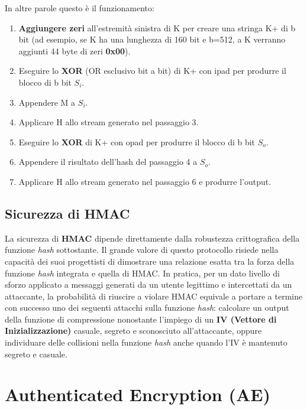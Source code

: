 \documentclass{article}
\begin{document}
\noindent In altre parole questo è il funzionamento:

\begin{enumerate}
    \item \textbf{Aggiungere zeri} all'estremità sinistra di K per creare una stringa K+ di b bit (ad esempio, se K ha una lunghezza di 160 bit e b=512, a K verranno aggiunti 44 byte di zeri \textbf{0x00}).
    \item Eseguire lo \textbf{XOR} (OR esclusivo bit a bit) di K+ con ipad per produrre il blocco di b bit $S_i$.
    \item Appendere M a $S_i$.
    \item Applicare H allo stream generato nel passaggio 3.
    \item Eseguire lo \textbf{XOR} di K+ con opad per produrre il blocco di b bit $S_o$.
    \item Appendere il risultato dell'hash del passaggio 4 a $S_o$.
    \item Applicare H allo stream generato nel passaggio 6 e produrre l'output.
\end{enumerate}

\vspace{0.5cm}

\subsection*{Sicurezza di HMAC}

La sicurezza di \textbf{HMAC} dipende direttamente dalla robustezza crittografica della funzione \textit{hash} sottostante. Il grande valore di questo protocollo risiede nella capacità dei suoi progettisti di dimostrare una relazione esatta tra la forza della funzione \textit{hash} integrata e quella di HMAC. In pratica, per un dato livello di sforzo applicato a messaggi generati da un utente legittimo e intercettati da un attaccante, la probabilità di riuscire a violare HMAC equivale a portare a termine con successo uno dei seguenti attacchi sulla funzione \textit{hash}: calcolare un output della funzione di compressione nonostante l'impiego di un \textbf{IV (Vettore di Inizializzazione)} casuale, segreto e sconosciuto all'attaccante, oppure individuare delle collisioni nella funzione \textit{hash} anche quando l'IV è mantenuto segreto e casuale.

\vspace{0.8cm}

\section*{Authenticated Encryption (AE)}
\end{document}
